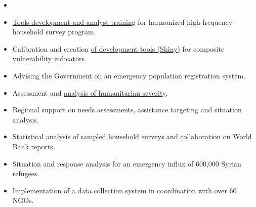 \documentclass[10pt,a4paper,ragged2e,withhyper]{altacv}
\begin{document}
\begin{paracol}{2}
\begin{itemize}
\item \item  \href{https://unhcrverse.github.io/unhcrverse/learn/}{Tools development and analyst training} for harmonized high-frequency household survey program.  
\item Calibration and creation \href{https://rstudio.unhcr.org/SeverityIndex/}{of development tools (Shiny)} for composite vulnerability indicators.
\end{itemize}

\divider

\begin{itemize}
\item Advising the Government on an emergency population registration system.  
\item Assessment and \href{https://humanitarian-user-group.github.io/post/compositeindicator/}{analysis of humanitarian severity}.  
\end{itemize}

\divider

\begin{itemize}
\item Regional support on needs assessments, assistance targeting and situation analysis.  
\item Statistical analysis of sampled household surveys and collaboration on World Bank reports.
\end{itemize}

\divider

\begin{itemize}
\item Situation and response analysis for an emergency influx of 600,000 Syrian refugees.
\item Implementation of a data collection system in coordination with over 60 NGOs.
\end{itemize}


\end{paracol}
\end{document}
